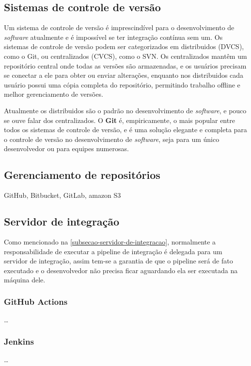 \subsection{Sistemas de controle de versão}
Um sistema de controle de versão é imprescindível para o desenvolvimento de \emph{software} atualmente e é impossível se ter integração contínua sem um. Os sistemas de controle de versão podem ser categorizados em distribuidos (DVCS), como o Git, ou centralizados (CVCS), como o SVN. Os centralizados mantêm um repositório central onde todas as versões são armazenadas, e os usuários precisam se conectar a ele para obter ou enviar alterações, enquanto nos distribuidos cada usuário possui uma cópia completa do repositório, permitindo trabalho offline e melhor gerenciamento de versões. 

Atualmente os distribuidos são o padrão no desenvolvimento de \emph{software}, e pouco se ouve falar dos centralizados. O \textbf{Git} é, empiricamente, o mais popular entre todos os sistemas de controle de versão, e é uma solução elegante e completa para o controle de versão no desenvolvimento de \emph{software}, seja para um único desenvolvedor ou para equipes numerosas.

\subsection{Gerenciamento de repositórios}
GitHub, Bitbucket, GitLab, amazon S3

\subsection{Servidor de integração}
Como mencionado na \autoref{subsecao-servidor-de-integracao}, normalmente a responsabilidade de executar a pipeline de integração é delegada para um servidor de integração, assim tem-se a garantia de que o pipeline será de fato executado e o desenvolvedor não precisa ficar aguardando ela ser executada na máquina dele.

\subsubsection*{GitHub Actions}
\dots

\subsubsection*{Jenkins}
\dots

